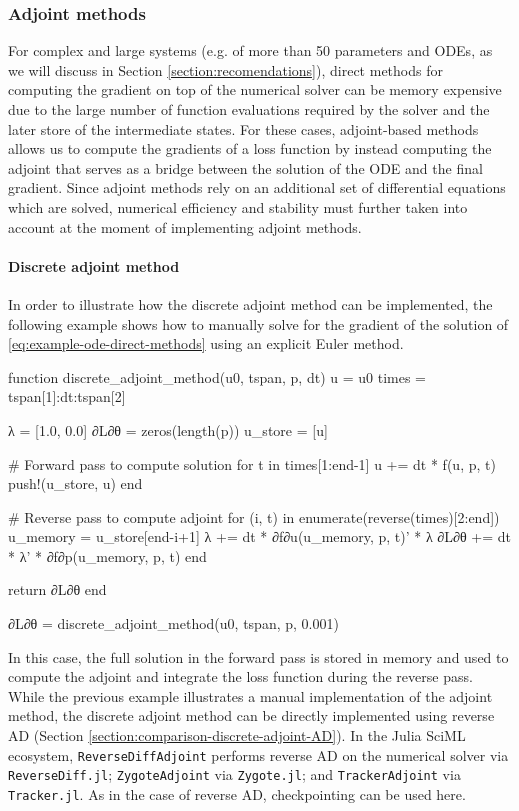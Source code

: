 \subsubsection{Adjoint methods}
\label{section:computing-adjoints}

For complex and large systems (e.g. of more than 50 parameters and ODEs, as we will discuss in Section \ref{section:recomendations}), direct methods for computing the gradient on top of the numerical solver can be memory expensive due to the large number of function evaluations required by the solver and the later store of the intermediate states. 
For these cases, adjoint-based methods allows us to compute the gradients of a loss function by instead computing the adjoint that serves as a bridge between the solution of the ODE and the final gradient. 
Since adjoint methods rely on an additional set of differential equations which are solved, numerical efficiency and stability must further taken into account at the moment of implementing adjoint methods.

\paragraph{Discrete adjoint method}

In order to illustrate how the discrete adjoint method can be implemented, the following example shows how to manually solve for the gradient of the solution of \eqref{eq:example-ode-direct-methods} using an explicit Euler method. 
\begin{jllisting}
function discrete_adjoint_method(u0, tspan, p, dt)
    u = u0
    times = tspan[1]:dt:tspan[2]

    λ = [1.0, 0.0]
    ∂L∂θ = zeros(length(p))
    u_store = [u]

    # Forward pass to compute solution
    for t in times[1:end-1]
        u += dt * f(u, p, t)
        push!(u_store, u)
    end

    # Reverse pass to compute adjoint
    for (i, t) in enumerate(reverse(times)[2:end])
        u_memory = u_store[end-i+1]
        λ += dt * ∂f∂u(u_memory, p, t)' * λ
        ∂L∂θ += dt * λ' * ∂f∂p(u_memory, p, t)
    end

    return ∂L∂θ
end

∂L∂θ = discrete_adjoint_method(u0, tspan, p, 0.001) 
\end{jllisting}
In this case, the full solution in the forward pass is stored in memory and used to compute the adjoint and integrate the loss function during the reverse pass. 
While the previous example illustrates a manual implementation of the adjoint method, the discrete adjoint method can be directly implemented using reverse AD (Section \ref{section:comparison-discrete-adjoint-AD}).
In the Julia SciML ecosystem, \texttt{ReverseDiffAdjoint} performs reverse AD on the numerical solver via \texttt{ReverseDiff.jl}; \texttt{ZygoteAdjoint} via \texttt{Zygote.jl}; and \texttt{TrackerAdjoint} via \texttt{Tracker.jl}. 
As in the case of reverse AD, checkpointing can be used here. 

